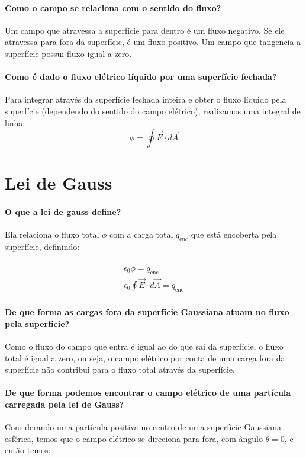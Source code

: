 \begin{multicols*}{2}
  \paragraph{Como o campo se relaciona com o sentido do fluxo?} Um campo que atravessa a superfície para dentro é um fluxo negativo. Se ele atravessa para fora da superfície, é um fluxo positivo. Um campo que tangencia a superfície possui fluxo igual a zero.

  \paragraph{Como é dado o fluxo elétrico líquido por uma superfície fechada?} Para integrar através da superfície fechada inteira e obter o fluxo líquido pela superfície (dependendo do sentido do campo elétrico), realizamos uma integral de linha:
  \[
    \phi = \oint \vec{E} \cdot d \vec{A}
  \]
\section*{Lei de Gauss}
  
  \paragraph{O que a lei de gauss define?} Ela relaciona o fluxo total $ \phi $ com a carga total $ q_{\text{enc}} $ que está encoberta pela superfície, definindo:

  \begin{gather}
    \begin{align}
      \epsilon_0 \phi = q_{\text{enc}} \\
      \epsilon_0 \oint \vec{E} \cdot d \vec{A} = q_{\text{enc}}
    \end{align}
  \end{gather}

  \paragraph{De que forma as cargas fora da superfície Gaussiana atuam no fluxo pela superfície?} Como o fluxo do campo que entra é igual ao do que sai da superfície, o fluxo total é igual a zero, ou seja, o campo elétrico por conta de uma carga fora da superfície não contribui para o fluxo total através da superfície.

  \paragraph{De que forma podemos encontrar o campo elétrico de uma partícula carregada pela lei de Gauss?} Considerando uma partícula positiva no centro de uma superfície Gaussiana esférica, temos que o campo elétrico se direciona para fora, com ângulo $ \theta = 0 $, e então temos:


\end{multicols*}
